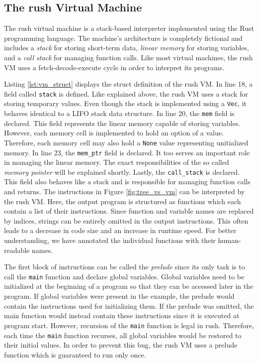 \subsection{The rush Virtual Machine}

The rush virtual machine is a stack-based interpreter implemented using the Rust programming language.
The machine's architecture is completely fictional and includes a \emph{stack} for storing short-term data, \emph{linear memory} for storing variables, and a \emph{call stack} for managing function calls.
Like most virtual machines, the rush VM uses a fetch-decode-execute cycle in order to interpret its programs.


Listing \ref{lst:vm_struct} displays the struct definition of the rush VM.
In line 18, a field called \texttt{stack} is defined.
Like explained above, the rush VM uses a stack for storing temporary values.
Even though the stack is implemented using a \texttt{Vec}, it behaves identical to a LIFO stack data structure.
In line 20, the \texttt{mem} field is declared.
This field represents the linear memory capable of storing variables.
However, each memory cell is implemented to hold an option of a value.
Therefore, each memory cell may also hold a \texttt{None} value representing unitialized memory.
In line 23, the \texttt{mem\_ptr} field is declared.
It too serves an important role in managing the linear memory.
The exact responsibilities of the so called \emph{memory pointer} will be explained shortly.
Lastly, the \texttt{call\_stack} is declared.
This field also behaves like a stack and is responsible for managing function calls and returns.
The instructions in Figure \ref{fig:tree_vs_vm} can be interpreted by the rush VM.
Here, the output program is structured as functions which each contain a list of their instructions.
Since function and variable names are replaced by indices, strings can be entirely omitted in the output instructions.
This often leads to a decrease in code size and an increase in runtime speed.
For better understanding, we have annotated the individual functions with their human-readable names.

The first block of instructions can be called the \emph{prelude} since its only task is to call the \texttt{main} function and declare global variables.
Global variables need to be initialized at the beginning of a program so that they can be accessed later in the program.
If global variables were present in the example, the prelude would contain the instructions used for initializing them.
If the prelude was omitted, the main function would instead contain these instructions since it is executed at program start.
However, recursion of the \texttt{main} function is legal in rush.
Therefore, each time the \texttt{main} function recurses, all global variables would be restored to their initial values.
In order to prevent this bug, the rush VM uses a prelude function which is guaranteed to run only once.

